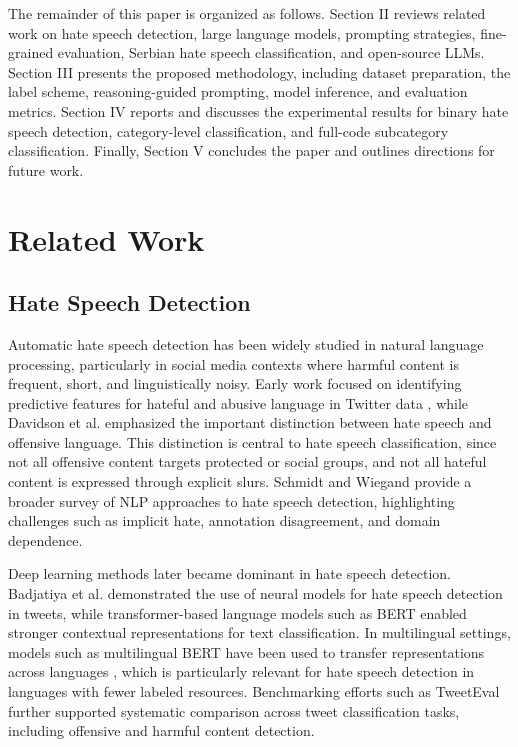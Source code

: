 \documentclass[a4paper]{article}
\begin{document}
The remainder of this paper is organized as follows. Section II reviews related work on hate speech detection, large language models, prompting strategies, fine-grained evaluation, Serbian hate speech classification, and open-source LLMs. Section III presents the proposed methodology, including dataset preparation, the label scheme, reasoning-guided prompting, model inference, and evaluation metrics. Section IV reports and discusses the experimental results for binary hate speech detection, category-level classification, and full-code subcategory classification. Finally, Section V concludes the paper and outlines directions for future work.

\section{Related Work}

\subsection{Hate Speech Detection}

Automatic hate speech detection has been widely studied in natural language processing, particularly in social media contexts where harmful content is frequent, short, and linguistically noisy. Early work focused on identifying predictive features for hateful and abusive language in Twitter data \cite{waseem2016hateful}, while Davidson et al. \cite{davidson2017automated} emphasized the important distinction between hate speech and offensive language. This distinction is central to hate speech classification, since not all offensive content targets protected or social groups, and not all hateful content is expressed through explicit slurs. Schmidt and Wiegand \cite{schmidt2017survey} provide a broader survey of NLP approaches to hate speech detection, highlighting challenges such as implicit hate, annotation disagreement, and domain dependence.

Deep learning methods later became dominant in hate speech detection. Badjatiya et al. \cite{badjatiya2017deep} demonstrated the use of neural models for hate speech detection in tweets, while transformer-based language models such as BERT \cite{devlin2019bert} enabled stronger contextual representations for text classification. In multilingual settings, models such as multilingual BERT have been used to transfer representations across languages \cite{pires2019multilingual}, which is particularly relevant for hate speech detection in languages with fewer labeled resources. Benchmarking efforts such as TweetEval \cite{barbieri2020tweeteval} further supported systematic comparison across tweet classification tasks, including offensive and harmful content detection.
\end{document}
